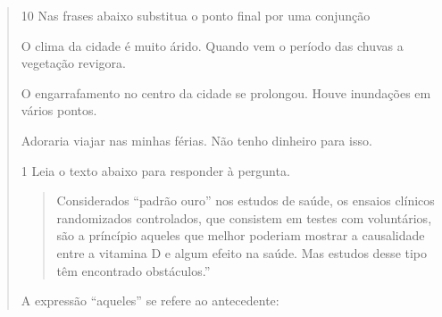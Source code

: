 \begin{quote}
{

\num{10} Nas frases abaixo substitua o ponto final por uma conjunção

\begin{escolha}

  \item O clima da cidade é muito árido. Quando vem o período das chuvas a
  vegetação revigora.

  
  \item O engarrafamento no centro da cidade se prolongou. Houve inundações em
  vários pontos.

  
  \item Adoraria viajar nas minhas férias. Não tenho dinheiro para isso.


\end{escolha}


\num{1} Leia o texto abaixo para responder à pergunta.

\begin{quote}

Considerados ``padrão ouro'' nos estudos de saúde, os ensaios clínicos
randomizados controlados, que consistem em testes com voluntários, são a
príncípio aqueles que melhor poderiam mostrar a causalidade entre a
vitamina D e algum efeito na saúde. Mas estudos desse tipo têm
encontrado obstáculos.''

\end{quote}


A expressão ``aqueles'' se refere ao antecedente:

\begin{escolha}


\end{escolha}}
\end{quote}
